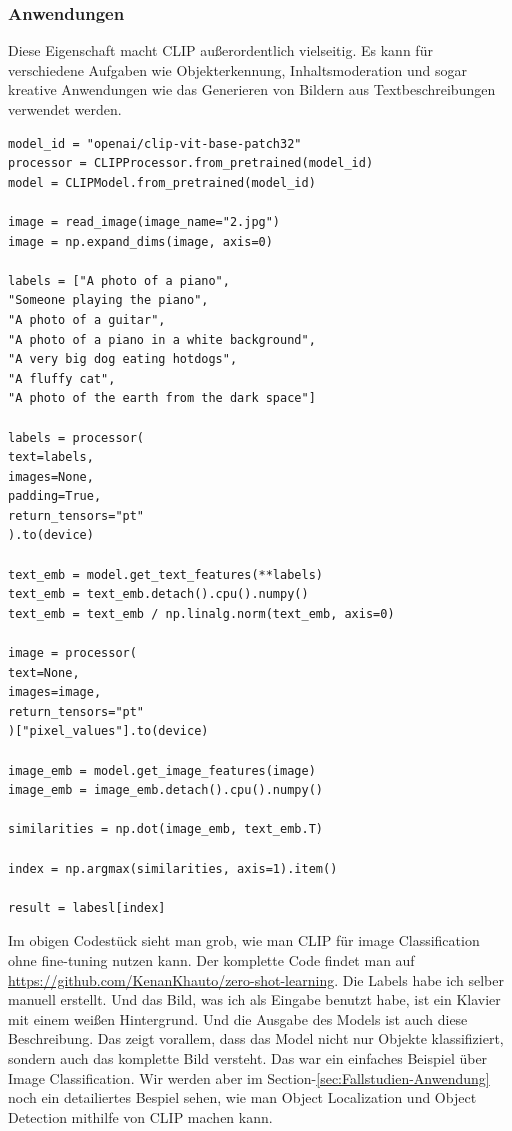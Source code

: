 \documentclass[nolibertine, ngerman, algorithm, nomencl, minted]{ttlab-qualify}
\begin{document}
\subsubsection{Anwendungen}
Diese Eigenschaft macht CLIP außerordentlich vielseitig. Es kann für verschiedene 
Aufgaben wie Objekterkennung, Inhaltsmoderation und sogar kreative Anwendungen wie 
das Generieren von Bildern aus Textbeschreibungen verwendet werden.

\begin{verbatim}
model_id = "openai/clip-vit-base-patch32"
processor = CLIPProcessor.from_pretrained(model_id)
model = CLIPModel.from_pretrained(model_id)

image = read_image(image_name="2.jpg")
image = np.expand_dims(image, axis=0)

labels = ["A photo of a piano", 
"Someone playing the piano", 
"A photo of a guitar", 
"A photo of a piano in a white background",
"A very big dog eating hotdogs", 
"A fluffy cat", 
"A photo of the earth from the dark space"]

labels = processor(
text=labels,
images=None,
padding=True,
return_tensors="pt"
).to(device)

text_emb = model.get_text_features(**labels)
text_emb = text_emb.detach().cpu().numpy()
text_emb = text_emb / np.linalg.norm(text_emb, axis=0)

image = processor(
text=None,
images=image,
return_tensors="pt"
)["pixel_values"].to(device)

image_emb = model.get_image_features(image)
image_emb = image_emb.detach().cpu().numpy()

similarities = np.dot(image_emb, text_emb.T)

index = np.argmax(similarities, axis=1).item()

result = labesl[index]
\end{verbatim}

Im obigen Codestück sieht man grob, wie man CLIP für image Classification ohne fine-tuning nutzen kann.
Der komplette Code findet man auf \url{https://github.com/KenanKhauto/zero-shot-learning}.
Die Labels habe ich selber manuell erstellt.
Und das Bild, was ich als Eingabe benutzt habe, ist ein Klavier mit einem weißen Hintergrund. Und die Ausgabe des Models ist auch diese Beschreibung.
Das zeigt vorallem, dass das Model nicht nur Objekte klassifiziert, sondern auch das komplette Bild versteht.
Das war ein einfaches Beispiel über Image Classification. Wir werden aber im Section-\ref{sec:Fallstudien-Anwendung} 
noch ein detailiertes Bespiel sehen, wie man Object Localization und Object Detection mithilfe von 
CLIP machen kann.
\end{document}
